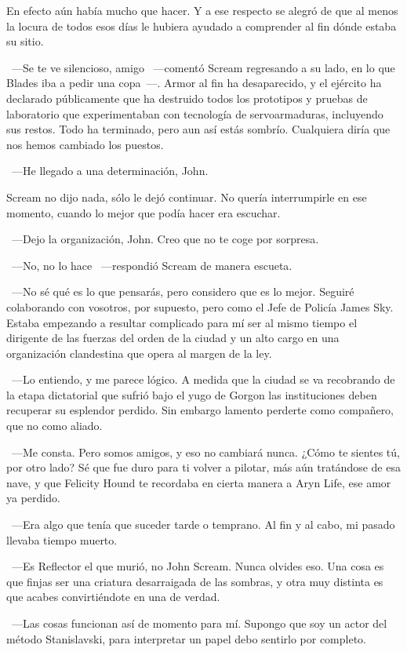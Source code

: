 En efecto aún había mucho que hacer. Y a ese respecto se alegró de que al menos la locura de todos esos días le hubiera ayudado a comprender al fin dónde estaba su sitio.

~---Se te ve silencioso, amigo ~---comentó Scream regresando a su lado, en lo que Blades iba a pedir una copa~---. Armor al fin ha desaparecido, y el ejército ha declarado públicamente que ha destruido todos los prototipos y pruebas de laboratorio que experimentaban con tecnología de servoarmaduras, incluyendo sus restos. Todo ha terminado, pero aun así estás sombrío. Cualquiera diría que nos hemos cambiado los puestos.

~---He llegado a una determinación, John.

Scream no dijo nada, sólo le dejó continuar. No quería interrumpirle en ese momento, cuando lo mejor que podía hacer era escuchar.

~---Dejo la organización, John. Creo que no te coge por sorpresa.

~---No, no lo hace ~---respondió Scream de manera escueta.

~---No sé qué es lo que pensarás, pero considero que es lo mejor. Seguiré colaborando con vosotros, por supuesto, pero como el Jefe de Policía James Sky. Estaba empezando a resultar complicado para mí ser al mismo tiempo el dirigente de las fuerzas del orden de la ciudad y un alto cargo en una organización clandestina que opera al margen de la ley.

~---Lo entiendo, y me parece lógico. A medida que la ciudad se va recobrando de la etapa dictatorial que sufrió bajo el yugo de Gorgon las instituciones deben recuperar su esplendor perdido. Sin embargo lamento perderte como compañero, que no como aliado.

~---Me consta. Pero somos amigos, y eso no cambiará nunca. ¿Cómo te sientes tú, por otro lado? Sé que fue duro para ti volver a pilotar, más aún tratándose de esa nave, y que Felicity Hound te recordaba en cierta manera a Aryn Life, ese amor ya perdido.

~---Era algo que tenía que suceder tarde o temprano. Al fin y al cabo, mi pasado llevaba tiempo muerto.

~---Es Reflector el que murió, no John Scream. Nunca olvides eso. Una cosa es que finjas ser una criatura desarraigada de las sombras, y otra muy distinta es que acabes convirtiéndote en una de verdad.

~---Las cosas funcionan así de momento para mí. Supongo que soy un actor del método Stanislavski, para interpretar un papel debo sentirlo por completo.

